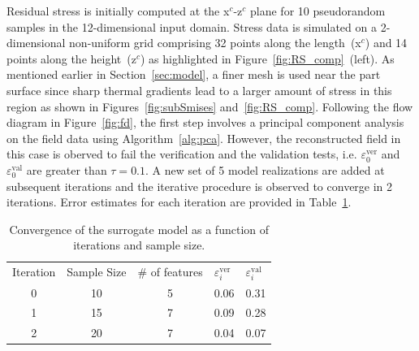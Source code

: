Residual stress is initially computed at the x$^c$-z$^c$ plane for 10 pseudorandom samples in the 12-dimensional
input domain. Stress data is simulated on a 2-dimensional non-uniform grid comprising 32 points along the
length~(x$^c$) and 14 points along the height~(z$^c$) as highlighted in Figure~\ref{fig:RS_comp}~(left).
As mentioned earlier in Section~\ref{sec:model}, a 
finer mesh is used near the part surface since sharp thermal gradients lead to a larger amount of stress
in this region as shown in Figures~\ref{fig:subSmises} and~\ref{fig:RS_comp}.  Following the flow diagram
in Figure~\ref{fig:fd}, the first step involves a principal component analysis on the field data using  
Algorithm~\ref{alg:pca}. However, the reconstructed field in this case is oberved to fail
the verification and the validation tests, i.e. $\varepsilon_0^{\text{ver}}$ and $\varepsilon_0^{\text{val}}$
are greater than $\tau=0.1$. A new set of 5 model realizations are added at subsequent iterations and the iterative
procedure is observed to converge in 2 iterations. Error estimates for each iteration are provided in
Table~\ref{tab:error}.
%
\begin{table}[htbp]
\centering
\caption{Convergence of the surrogate model as a function of iterations and sample size.}
\label{tab:error}
\vspace{1mm}
\begin{tabular}{ cccll}
\toprule
Iteration &  Sample Size & $\#$ of features & $\varepsilon_i^{\text{ver}}$ & $\varepsilon_i^{\text{val}}$\\
0 & 10 & 5 & 0.06 & 0.31 \\
1 & 15 & 7 & 0.09 & 0.28 \\
2 & 20 & 7 & 0.04 & 0.07\\
\bottomrule
\end{tabular}
\end{table}


